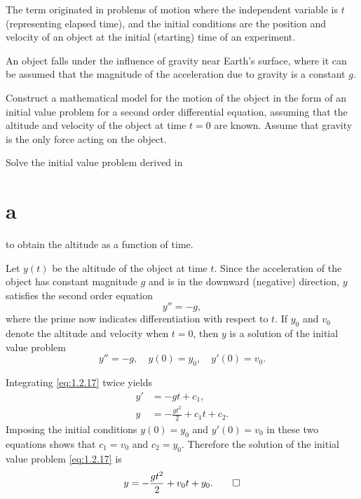 
The term   originated in problems
of motion where the independent variable is $t$
(representing elapsed time), and the initial conditions
are the position and velocity of an object at the initial
(starting) time of an experiment.

\begin{example}\label{example:1.2.8}
An object falls under the influence of gravity near Earth's
surface, where it can be assumed that the magnitude of the
acceleration due to gravity is a constant $g$.
\begin{alist}
\item %
 Construct a mathematical model for the motion of the object in the
form of an initial value problem for a second order differential
equation, assuming that the altitude and velocity of the object at
time $t=0$ are known. Assume that gravity is the only force acting on
the object.
\item %
 Solve the initial value problem derived in \part{a} to obtain the
altitude as a function of time.
\end{alist}
\end{example}

\begin{alistSolution}
\item Let $y(t)$ be the altitude of the object at time $t$.
 Since the acceleration of the object has
constant magnitude $g$ and is in the downward (negative) direction,
$y$ satisfies the second order equation
\[
y''=-g,
\]
where the prime now indicates differentiation with respect to $t$.
If $y_0$ and $v_0$ denote the altitude and velocity when
$t=0$, then $y$ is a solution of the initial value problem
\begin{equation} \label{eq:1.2.17}
y''=-g,\quad  y(0)=y_0,\quad y'(0)=v_0.
\end{equation}

\item
Integrating \eqref{eq:1.2.17} twice yields
\begin{align*}
y'&=-gt+c_1, \\
y&=-\frac{gt^2}{2}+c_1t+c_2.
\end{align*}
Imposing the initial conditions $y(0)=y_0$ and $y'(0)=v_0$ in these
two equations shows that $c_1=v_0$ and $c_2=y_0$. Therefore the
solution of the initial value problem \eqref{eq:1.2.17} is
\[y=-\frac{gt^2}{2}+v_0t+y_0.\qedhere\]
\end{alistSolution}

